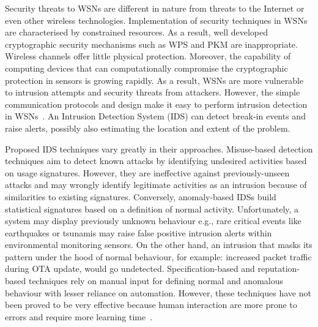 \documentclass{CRPITStyle}
\renewcommand{\cite}{\citep}
\begin{document}
Security threats to WSNs are different in nature from threats to the Internet or even other wireless technologies. %
Implementation of security techniques in WSNs are characterised by constrained resources.
As a result, well developed cryptographic security mechanisms such as WPS and PKM are inappropriate.
Wireless channels offer little physical protection.
Moreover, the capability of computing devices that can computationally compromise the cryptographic protection in sensors is growing rapidly.
As a result, WSNs are more vulnerable to intrusion attempts and security threats from attackers.
However, the simple communication protocols and design make it easy to perform intrusion detection in WSNs~\cite{quing09}.
An Intrusion Detection System (IDS) can detect  break-in events and raise alerts, possibly also estimating the location and extent of the problem. %


Proposed IDS techniques vary greatly in their approaches.
Misuse-based  detection  techniques aim to detect known attacks by identifying undesired activities based on usage signatures.
However, they are ineffective against previously-unseen attacks and 
may wrongly identify legitimate activities as an intrusion because of similarities to existing signatures.
Conversely, anomaly-based IDSs build statistical signatures based on a definition of normal activity.
Unfortunately, a system may display previously unknown behaviour e.g., rare critical events like earthquakes or tsunamis may raise false positive intrusion alerts within environmental monitoring sensors.
On the other hand, an intrusion that masks its pattern under the hood of normal behaviour, for example: increased packet traffic during OTA update, would go undetected.
Specification-based and reputation-based techniques rely on manual input for defining normal and anomalous behaviour with lesser reliance on automation.
However, these techniques have not been proved to be very effective because human interaction are more prone to errors and require more learning time~\cite{quing09, 1593102, 1290173, Chen:2009:NMI:1516241.1516282}. 
\end{document}
